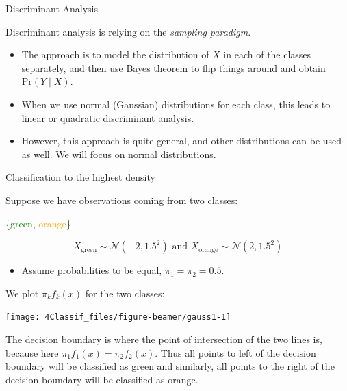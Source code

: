 \documentclass[10pt,ignorenonframetext,]{beamer}
\providecommand{\tightlist}{%
  \setlength{\itemsep}{0pt}\setlength{\parskip}{0pt}}
\begin{document}
\begin{frame}{Discriminant Analysis}

\vspace{2mm} Discriminant analysis is relying on the \emph{sampling
paradigm}.

\vspace{2mm}

\begin{itemize}
\item
  The approach is to model the distribution of \(X\) in each of the
  classes separately, and then use Bayes theorem to flip things around
  and obtain \(\text{Pr}(Y \mid X)\).
\item
  When we use normal (Gaussian) distributions for each class, this leads
  to linear or quadratic discriminant analysis.
\item
  However, this approach is quite general, and other distributions can
  be used as well. We will focus on normal distributions.
\end{itemize}

\end{frame}

\begin{frame}

\begin{block}{Classification to the highest density}

\vspace{2mm}

Suppose we have observations coming from two classes:

\{\textcolor{green}{green}, \textcolor{orange}{orange}\}

\[X_{\text{green}}\sim \mathcal{N}(-2, 1.5^2) \text{ and }
X_{\text{orange}}\sim \mathcal{N}(2, 1.5^2) \]

\begin{itemize}
\tightlist
\item
  Assume probabilities to be equal, \(\pi_1 = \pi_2 = 0.5\).
\end{itemize}

\end{block}

\end{frame}

\begin{frame}

We plot \(\pi_k f_k(x)\) for the two classes:

\begin{center}\texttt{[image: 4Classif\_files/figure-beamer/gauss1-1]} \end{center}

The decision boundary is where the point of intersection of the two
lines is, because here \(\pi_1 f_1(x)=\pi_2 f_2(x)\). Thus all points to
left of the decision boundary will be classified as green and similarly,
all points to the right of the decision boundary will be classified as
orange.

\end{frame}
\end{document}
